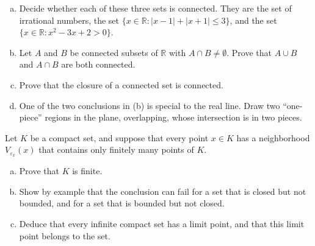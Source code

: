 \begin{problem}
\begin{enumerate}[(a)]
	\item Decide whether each of these three sets is connected.  They are the set of irrational numbers, the set $\{x \in \mathbb{R} : |x - 1| + |x + 1| \leq 3\}$, and the set $\{x \in \mathbb{R} : x^2 - 3x + 2 > 0\}$.
	\item Let $A$ and $B$ be connected subsets of $\mathbb{R}$ with $A \cap B \neq \emptyset$.  Prove that $A \cup B$ and $A \cap B$ are both connected.
	\item Prove that the closure of a connected set is connected.
	\item One of the two conclusions in (b) is special to the real line.  Draw two ``one-piece'' regions in the plane, overlapping, whose intersection is in two pieces.
\end{enumerate}
\end{problem}

\begin{problem}
Let $K$ be a compact set, and suppose that every point $x \in K$ has a neighborhood $V_{\varepsilon_x}(x)$ that contains only finitely many points of $K$.
\begin{enumerate}[(a)]
	\item Prove that $K$ is finite.
	\item Show by example that the conclusion can fail for a set that is closed but not bounded, and for a set that is bounded but not closed.
	\item Deduce that every infinite compact set has a limit point, and that this limit point belongs to the set.
\end{enumerate}
\end{problem}
